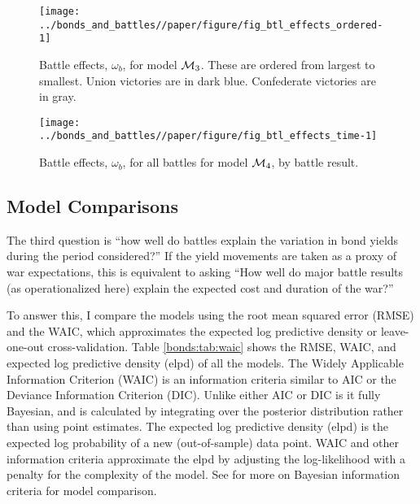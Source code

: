 \begin{figure}[!htpb]
  \centering
  \texttt{[image: ../bonds\_and\_battles//paper/figure/fig\_btl\_effects\_ordered-1]}  
  \caption[Battle effects, $\omega_{b}$, for model $\Model{3}$.]{
    Battle effects, $\omega_{b}$, for model $\Model{3}$.
    These are ordered from largest to smallest.
    Union victories are in dark blue.
    Confederate victories are in gray.
  }
  \label{bonds:fig:btl_effects_ordered}
\end{figure}

\begin{figure}[!htpb]
  \centering
  \texttt{[image: ../bonds\_and\_battles//paper/figure/fig\_btl\_effects\_time-1]}  
  \caption{Battle effects, $\omega_{b}$, for all battles for model $\mathcal{M}_{\text{4}}$, by battle result.}
  \label{bonds:fig:btl_effects_time}
\end{figure}



\subsection{Model Comparisons}
\label{sec:over-effects-battl}

The third question is ``how well do battles explain the variation in bond yields during the period considered?''
If the yield movements are taken as a proxy of war expectations, this is equivalent to asking ``How well do major battle results (as operationalized here) explain the expected cost and duration of the war?''

To answer this, I compare the models using the root mean squared error (RMSE) and the WAIC, which approximates the expected log predictive density or leave-one-out cross-validation.
Table \ref{bonds:tab:waic} shows the RMSE, WAIC, and expected log predictive density (elpd) of all the models.
The Widely Applicable Information Criterion (WAIC) \parencite{Watanabe2010} is an information criteria similar to AIC or the Deviance Information Criterion (DIC).
Unlike either AIC or DIC is it fully Bayesian, and is calculated by integrating over the posterior distribution rather than using point estimates.
The expected log predictive density (elpd) is the expected log probability of a new (out-of-sample) data point.
WAIC and other information criteria approximate the elpd by adjusting the  log-likelihood with a penalty for the complexity of the model.
See \textcites[Ch. 7]{GelmanCarlinSternEtAl2013a}{GelmanHwangVehtari2014a}{GelmanVehtari2014a} for more on Bayesian information criteria for model comparison.

